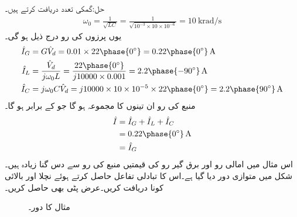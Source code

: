 حل:گمکی تعدد دریافت کرتے ہیں۔
\begin{align*}
\omega_0=\frac{1}{\sqrt{LC}}=\frac{1}{\sqrt{10^{-3} \times 10\times 10^{-6}}}=\SI{10}{\kilo\radian\per\second}
\end{align*}
یوں پرزوں کی رو درج ذیل ہو گی۔
\begin{align*}
\hat{I}_G&=G\hat{V}_d=0.01\times 22\phase{0^{\circ}}=0.22\phase{0^{\circ}}\,\si{\ampere}\\
\hat{I}_L&=\frac{\hat{V}_d}{j\omega_0 L}=\frac{22\phase{0^{\circ}}}{j 10000 \times 0.001}=2.2\phase{-90^{\circ}}\,\si{\ampere}\\
\hat{I}_C&=j\omega_0 C \hat{V}_d=j 10000\times 10\times 10^{-5} \times 22\phase{0^{\circ}}=2.2\phase{90^{\circ}}\,\si{\ampere}
\end{align*}
منبع کی رو ان تینوں کا مجموعہ ہو گا جو  کے برابر ہو گا۔
\begin{align*}
\hat{I}&=\hat{I}_G+\hat{I}_L+\hat{I}_C\\
&=0.22\phase{0^{\circ}}\,\si{\ampere}\\
&=\hat{I}_G
\end{align*}
اس مثال میں امالی رو اور برق گیر رو کی قیمتیں منبع کی رو سے دس گنا زیادہ ہیں۔
شکل  میں متوازی  دور دیا گیا ہے۔اس کا تبادلی تفاعل  حاصل کرتے ہوئے  نچلا اور بالائی کونا دریافت کریں۔عرض پٹی بھی حاصل کریں۔
\begin{figure}
\centering
{}
\caption{مثال  کا دور۔}
\label{شکل_تعددی_متوازی_عرض_پٹی}
\end{figure}

